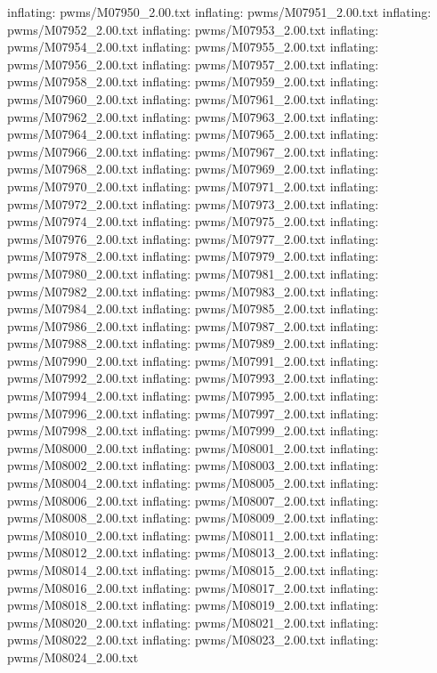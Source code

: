 \documentclass[letterpaper,10pt,english]{sphinxmanual}
\begin{document}
{\begin{sphinxVerbatim}[commandchars=\\\{\}]
  inflating: pwms/M07950\_2.00.txt
  inflating: pwms/M07951\_2.00.txt
  inflating: pwms/M07952\_2.00.txt
  inflating: pwms/M07953\_2.00.txt
  inflating: pwms/M07954\_2.00.txt
  inflating: pwms/M07955\_2.00.txt
  inflating: pwms/M07956\_2.00.txt
  inflating: pwms/M07957\_2.00.txt
  inflating: pwms/M07958\_2.00.txt
  inflating: pwms/M07959\_2.00.txt
  inflating: pwms/M07960\_2.00.txt
  inflating: pwms/M07961\_2.00.txt
  inflating: pwms/M07962\_2.00.txt
  inflating: pwms/M07963\_2.00.txt
  inflating: pwms/M07964\_2.00.txt
  inflating: pwms/M07965\_2.00.txt
  inflating: pwms/M07966\_2.00.txt
  inflating: pwms/M07967\_2.00.txt
  inflating: pwms/M07968\_2.00.txt
  inflating: pwms/M07969\_2.00.txt
  inflating: pwms/M07970\_2.00.txt
  inflating: pwms/M07971\_2.00.txt
  inflating: pwms/M07972\_2.00.txt
  inflating: pwms/M07973\_2.00.txt
  inflating: pwms/M07974\_2.00.txt
  inflating: pwms/M07975\_2.00.txt
  inflating: pwms/M07976\_2.00.txt
  inflating: pwms/M07977\_2.00.txt
  inflating: pwms/M07978\_2.00.txt
  inflating: pwms/M07979\_2.00.txt
  inflating: pwms/M07980\_2.00.txt
  inflating: pwms/M07981\_2.00.txt
  inflating: pwms/M07982\_2.00.txt
  inflating: pwms/M07983\_2.00.txt
  inflating: pwms/M07984\_2.00.txt
  inflating: pwms/M07985\_2.00.txt
  inflating: pwms/M07986\_2.00.txt
  inflating: pwms/M07987\_2.00.txt
  inflating: pwms/M07988\_2.00.txt
  inflating: pwms/M07989\_2.00.txt
  inflating: pwms/M07990\_2.00.txt
  inflating: pwms/M07991\_2.00.txt
  inflating: pwms/M07992\_2.00.txt
  inflating: pwms/M07993\_2.00.txt
  inflating: pwms/M07994\_2.00.txt
  inflating: pwms/M07995\_2.00.txt
  inflating: pwms/M07996\_2.00.txt
  inflating: pwms/M07997\_2.00.txt
  inflating: pwms/M07998\_2.00.txt
  inflating: pwms/M07999\_2.00.txt
  inflating: pwms/M08000\_2.00.txt
  inflating: pwms/M08001\_2.00.txt
  inflating: pwms/M08002\_2.00.txt
  inflating: pwms/M08003\_2.00.txt
  inflating: pwms/M08004\_2.00.txt
  inflating: pwms/M08005\_2.00.txt
  inflating: pwms/M08006\_2.00.txt
  inflating: pwms/M08007\_2.00.txt
  inflating: pwms/M08008\_2.00.txt
  inflating: pwms/M08009\_2.00.txt
  inflating: pwms/M08010\_2.00.txt
  inflating: pwms/M08011\_2.00.txt
  inflating: pwms/M08012\_2.00.txt
  inflating: pwms/M08013\_2.00.txt
  inflating: pwms/M08014\_2.00.txt
  inflating: pwms/M08015\_2.00.txt
  inflating: pwms/M08016\_2.00.txt
  inflating: pwms/M08017\_2.00.txt
  inflating: pwms/M08018\_2.00.txt
  inflating: pwms/M08019\_2.00.txt
  inflating: pwms/M08020\_2.00.txt
  inflating: pwms/M08021\_2.00.txt
  inflating: pwms/M08022\_2.00.txt
  inflating: pwms/M08023\_2.00.txt
  inflating: pwms/M08024\_2.00.txt

\end{sphinxVerbatim}}
\end{document}
